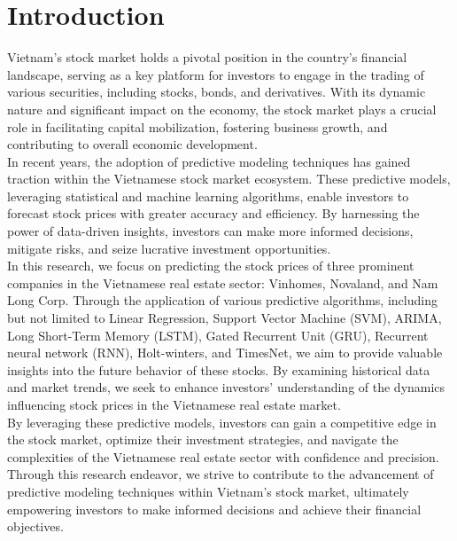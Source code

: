 \documentclass{ieeeojies}
\begin{document}
	\section{Introduction}
	Vietnam's stock market holds a pivotal position in the country's financial landscape, serving as a key platform for investors to engage in the trading of various securities, including stocks, bonds, and derivatives. With its dynamic nature and significant impact on the economy, the stock market plays a crucial role in facilitating capital mobilization, fostering business growth, and contributing to overall economic development.\\
	In recent years, the adoption of predictive modeling techniques has gained traction within the Vietnamese stock market ecosystem. These predictive models, leveraging statistical and machine learning algorithms, enable investors to forecast stock prices with greater accuracy and efficiency. By harnessing the power of data-driven insights, investors can make more informed decisions, mitigate risks, and seize lucrative investment opportunities.\\
	In this research, we focus on predicting the stock prices of three prominent companies in the Vietnamese real estate sector: Vinhomes, Novaland, and Nam Long Corp. Through the application of various predictive algorithms, including but not limited to Linear Regression, Support Vector Machine (SVM), ARIMA, Long Short-Term Memory (LSTM), Gated Recurrent Unit (GRU), Recurrent neural network (RNN), Holt-winters, and TimesNet, we aim to provide valuable insights into the future behavior of these stocks. By examining historical data and market trends, we seek to enhance investors' understanding of the dynamics influencing stock prices in the Vietnamese real estate market.\\
	By leveraging these predictive models, investors can gain a competitive edge in the stock market, optimize their investment strategies, and navigate the complexities of the Vietnamese real estate sector with confidence and precision. Through this research endeavor, we strive to contribute to the advancement of predictive modeling techniques within Vietnam's stock market, ultimately empowering investors to make informed decisions and achieve their financial objectives. 
	
\end{document}
